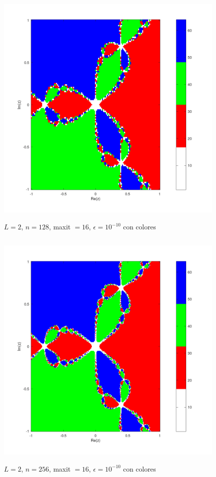 \documentclass{article} %
\begin{document}
\begin{figure}[H]
    \centering
    \includegraphics[width=152mm, height=120mm]{images/L2n128maxit16e10-10color.png}
    \caption{$L=2$, $n=128$, maxit $=16$, $\epsilon=10^{-10}$ con colores}
\end{figure}

\begin{figure}[H]
    \centering
    \includegraphics[width=152mm, height=120mm]{images/L2n256maxit16e10-10color.png}
    \caption{$L=2$, $n=256$, maxit $=16$, $\epsilon=10^{-10}$ con colores}
\end{figure}
\end{document}
